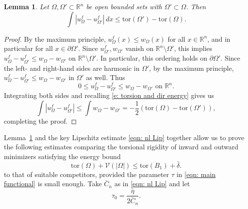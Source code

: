 \documentclass[10pt, reqno]{amsart}
\numberwithin{equation}{section}
\newtheorem{lemma}[theorem]{Lemma}
\def\R{{\mathbb R}}
\def\W{\Omega}
\def\tor{\mathrm{tor}}
\def\fvbar{\mathscr{V}}
\def\pa{{\partial}}
\def\ccdel{\bar{\delta}}
\begin{document}
\begin{lemma}\label{lemma: key estimate}
	Let $\W, \W' \subset \R^n$ be open bounded sets with $\W' \subset \W$.
    Then 
	\begin{equation}\label{eqn: key estimate}
	\int |u_{\W}^f - u_{\W'}^f| \,dx \leq \tor(\W') - \tor(\W).
		\end{equation}
\end{lemma}
\begin{proof}
	By the maximum principle, $u_{\W}^f(x)\leq w_{\W}(x)$ for all $x \in \R^n$, and in particular for all $x \in \pa \W'$. Since $u_{\W'}^f , w_{\W'}$ vanish on $\R^n \setminus\W'$, this implies $u_{\W}^f - u_{\W'}^f \leq w_{\W} - w_{\W'}$ on $\R^n\setminus \W'$. In particular, this ordering holds on  $\partial \W'$. Since the left- and right-hand sides are harmonic in $\W'$,  by the maximum principle, $u_{\W}^f - u_{\W'}^f \leq w_{\W} - w_{\W'}$ in $\W'$ as well. Thus 
	\[
	0 \leq u_{\W}^f - u_{\W'}^f \leq w_{\W} - w_{\W'} \text{ on } \R^n.
	\] 
	Integrating both sides and recalling \eqref{e: torsion and dir energy} gives us 
	\[
	\int |u_{\W}^f - u_{\W'}^f| \leq \int w_{\W} - w_{\W'} = -\frac{1}{2} \left(\tor(\W) - \tor(\W')\right),
	\]
	completing the proof.
\end{proof}
%
%
%
%
%
 Lemma~\ref{lemma: key estimate} and the key Lipschitz estimate \eqref{eqn: nl Lip} together allow us to prove the following estimates comparing the torsional rigidity of  inward and outward minimizers satisfying the energy bound 
\begin{equation}\label{eqn: low base energy main}
    \tor(\W) + \fvbar(|\W|) \leq \tor(B_1)+\ccdel.
\end{equation}
to that of suitable competitors, provided the parameter $\tau$ in \eqref{eqn: main functional} is small enough.  Take $\bar{C}_n$ as in \eqref{eqn: nl Lip} and let 
 \begin{equation}\label{eqn: tau 0}
     \tau_0= \frac{\bar\eta}{2 \bar{C}_n} .
 \end{equation}
%
%
\end{document}
